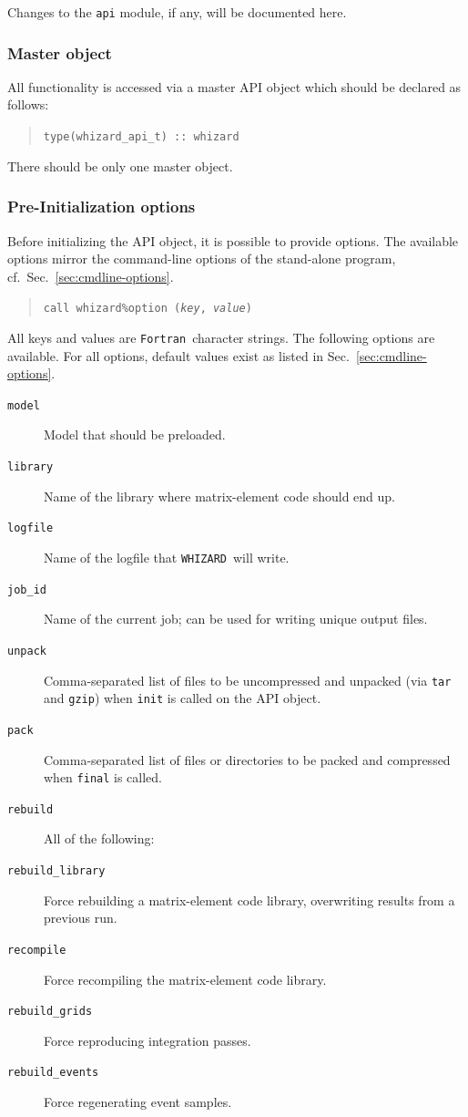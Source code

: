 \documentclass[12pt]{book}
\newcommand{\ttt}[1]{\texttt{#1}}
\newcommand{\whizard}{\ttt{WHIZARD}}
\newcommand{\fortran}{\ttt{Fortran}}
\begin{document}
Changes to the \ttt{api} module, if any, will be documented here.

\subsubsection{Master object}
All functionality is accessed via a master API object which should be declared
as follows:
\begin{quote}
  \tt type(whizard\_api\_t) :: whizard
\end{quote}
There should be only one master object.

\subsubsection{Pre-Initialization options}
Before initializing the API object, it is possible to provide options.  The
available options mirror the command-line options of the stand-alone program,
cf.\ Sec.~\ref{sec:cmdline-options}.
\begin{quote}
  \tt call whizard\%option (\textit{key}, \textit{value})
\end{quote}
All keys and values are \fortran\ character strings.  The following options are
available.  For all options, default values exist as listed in
Sec.~\ref{sec:cmdline-options}.
\begin{description}
\item[\tt model] Model that should be preloaded.
\item[\tt library] Name of the library where matrix-element code should end up.
\item[\tt logfile] Name of the logfile that \whizard\ will write.
\item[\tt job\_id] Name of the current job; can be used for writing unique output
  files.
\item[\tt unpack] Comma-separated list of files to be uncompressed and unpacked
  (via \ttt{tar} and \ttt{gzip}) when \ttt{init} is called on the API object.
\item[\tt pack] Comma-separated list of files or directories to be packed and
  compressed when \ttt{final} is called.
\item[\tt rebuild] All of the following:
\item[\tt rebuild\_library]  Force rebuilding a matrix-element code library,
  overwriting results from a previous run.
\item[\tt recompile]  Force recompiling the matrix-element code library.
\item[\tt rebuild\_grids]  Force reproducing integration passes.
\item[\tt rebuild\_events]  Force regenerating event samples.
\end{description}
\end{document}
